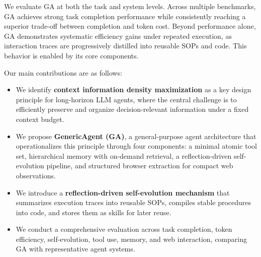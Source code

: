 We evaluate GA at both the task and system levels. 
Across multiple benchmarks, GA achieves strong task completion performance while consistently reaching a superior trade-off between completion and token cost. 
Beyond performance alone, GA demonstrates systematic efficiency gains under repeated execution, as interaction traces are progressively distilled into reusable SOPs and code. 
This behavior is enabled by its core components.

Our main contributions are as follows:
\begin{itemize}[leftmargin=*]

\item We identify \textbf{context information density maximization} as a key design principle for long-horizon LLM agents, where the central challenge is to efficiently preserve and organize decision-relevant information under a fixed context budget.

\item We propose \textbf{GenericAgent (GA)}, a general-purpose agent architecture that operationalizes this principle through four components: a minimal atomic tool set, hierarchical memory with on-demand retrieval, a reflection-driven self-evolution pipeline, and structured browser extraction for compact web observations.

\item We introduce a \textbf{reflection-driven self-evolution mechanism} that summarizes execution traces into reusable SOPs, compiles stable procedures into code, and stores them as skills for later reuse.

\item We conduct a comprehensive evaluation across task completion, token efficiency, self-evolution, tool use, memory, and web interaction, comparing GA with representative agent systems.
\end{itemize}
